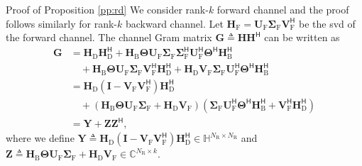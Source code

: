 \documentclass[journal]{IEEEtran}
\begin{document}
\begin{appendix}
	\begin{subsection}{Proof of Proposition \ref{pp:rd}}
		\label{ap:rank_deficient}
		We consider rank-$k$ forward channel and the proof follows similarly for rank-$k$ backward channel.
		Let $\mathbf{H}_\mathrm{F} = \mathbf{U}_\mathrm{F} \mathbf{\Sigma}_\mathrm{F} \mathbf{V}_\mathrm{F}^\mathsf{H}$ be the \gls{svd} of the forward channel.
		The channel Gram matrix $\mathbf{G} \triangleq \mathbf{H} \mathbf{H}^\mathsf{H} $ can be written as
		\begin{equation*}
			\begin{split}
				\mathbf{G}
				& = \mathbf{H}_\mathrm{D} \mathbf{H}_\mathrm{D}^\mathsf{H} + \mathbf{H}_\mathrm{B} \mathbf{\Theta} \mathbf{U}_\mathrm{F} \mathbf{\Sigma}_\mathrm{F} \mathbf{\Sigma}_\mathrm{F}^\mathsf{H} \mathbf{U}_\mathrm{F}^\mathsf{H} \mathbf{\Theta}^\mathsf{H} \mathbf{H}_\mathrm{B}^\mathsf{H}                                                         \\
				& \quad + \mathbf{H}_\mathrm{B} \mathbf{\Theta} \mathbf{U}_\mathrm{F} \mathbf{\Sigma}_\mathrm{F} \mathbf{V}_\mathrm{F}^\mathsf{H} \mathbf{H}_\mathrm{D}^\mathsf{H} + \mathbf{H}_\mathrm{D} \mathbf{V}_\mathrm{F} \mathbf{\Sigma}_\mathrm{F} \mathbf{U}_\mathrm{F}^\mathsf{H} \mathbf{\Theta}^\mathsf{H} \mathbf{H}_\mathrm{B}^\mathsf{H}       \\
				& = \mathbf{H}_\mathrm{D} (\mathbf{I} - \mathbf{V}_\mathrm{F} \mathbf{V}_\mathrm{F}^\mathsf{H}) \mathbf{H}_\mathrm{D}^\mathsf{H}                                                                                                                                                                                                               \\
				& \quad + (\mathbf{H}_\mathrm{B} \mathbf{\Theta} \mathbf{U}_\mathrm{F} \mathbf{\Sigma}_\mathrm{F} + \mathbf{H}_\mathrm{D} \mathbf{V}_\mathrm{F}) (\mathbf{\Sigma}_\mathrm{F} \mathbf{U}_\mathrm{F}^\mathsf{H} \mathbf{\Theta}^\mathsf{H} \mathbf{H}_\mathrm{B}^\mathsf{H} + \mathbf{V}_\mathrm{F}^\mathsf{H} \mathbf{H}_\mathrm{D}^\mathsf{H}) \\
				& = \mathbf{Y} + \mathbf{Z} \mathbf{Z}^\mathsf{H},
			\end{split}
		\end{equation*}
		where we define $\mathbf{Y} \triangleq \mathbf{H}_\mathrm{D} (\mathbf{I} - \mathbf{V}_\mathrm{F} \mathbf{V}_\mathrm{F}^\mathsf{H}) \mathbf{H}_\mathrm{D}^\mathsf{H} \in \mathbb{H}^{N_\mathrm{R} \times N_\mathrm{R}}$ and $\mathbf{Z} \triangleq \mathbf{H}_\mathrm{B} \mathbf{\Theta} \mathbf{U}_\mathrm{F} \mathbf{\Sigma}_\mathrm{F} + \mathbf{H}_\mathrm{D} \mathbf{V}_\mathrm{F} \in \mathbb{C}^{N_\mathrm{R} \times k}$.

\end{subsection}
\end{appendix}
\end{document}
